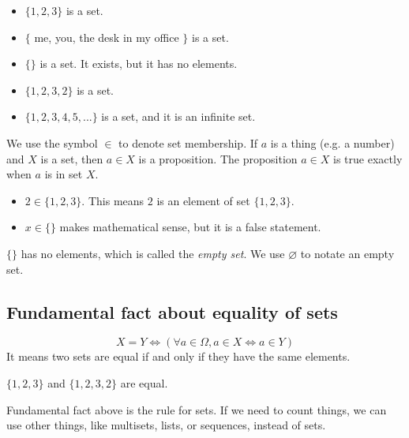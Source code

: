 \documentclass[a4paper]{article}
\begin{document}
\begin{eg}\leavevmode
	\begin{itemize}
		\item $\{1, 2, 3\}$ is a set.
		\item $\{$ me, you, the desk in my office $\}$ is a set.
		\item $\{\}$ is a set. It exists, but it has no elements.
		\item $\{1, 2, 3, 2\}$ is a set.
		\item $\{1, 2, 3, 4, 5, ...\}$ is a set, and it is an infinite set.
	\end{itemize}
\end{eg}

We use the symbol $\in$ to denote set membership. If $a$ is a thing (e.g. a number) and $X$ is a set, then $a \in X$ is a proposition. The proposition $a \in X$ is true exactly when $a$ is in set $X$.

\begin{eg}\leavevmode
	\begin{itemize}
		\item $2 \in \{ 1, 2, 3 \}$. This means $2$ is an element of set $\{ 1, 2, 3 \}$.
		\item $x \in \{ \}$ makes mathematical sense, but it is a false statement.
	\end{itemize}
\end{eg}

\begin{notation}
$\{ \}$ has no elements, which is called the \emph{empty set}. We use $\varnothing$ to notate an empty set.
\end{notation}

\subsection{Fundamental fact about equality of sets}

\begin{defi}
\[
	X = Y \iff (\forall a \in \Omega, a \in X \iff a \in Y)
\]
It means two sets are equal if and only if they have the same elements.
\end{defi}

\begin{eg}
$\{ 1, 2, 3 \}$ and $\{ 1, 2, 3, 2 \}$ are equal.
\end{eg}

Fundamental fact above is the rule for sets. If we need to count things, we can use other things, like multisets, lists, or sequences, instead of sets.
\end{document}
